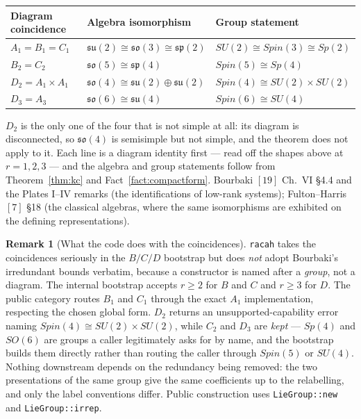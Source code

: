 \documentclass[11pt,a4paper]{article}
\theoremstyle{plain}
\theoremstyle{definition}
\newtheorem{remark}[theorem]{Remark}
\newcommand{\su}{\mathfrak{su}}
\newcommand{\so}{\mathfrak{so}}
\newcommand{\symp}{\mathfrak{sp}}
\newcommand{\code}[1]{\texttt{#1}}
\begin{document}
\begin{center}
\begin{tabular}{@{}lll@{}}
\toprule
Diagram coincidence & Algebra isomorphism & Group statement \\
\midrule
$A_1 = B_1 = C_1$ & $\su(2)\cong\so(3)\cong\symp(2)$ & $SU(2)\cong Spin(3)\cong Sp(2)$ \\
$B_2 = C_2$ & $\so(5)\cong\symp(4)$ & $Spin(5)\cong Sp(4)$ \\
$D_2 = A_1\times A_1$ & $\so(4)\cong\su(2)\oplus\su(2)$ & $Spin(4)\cong SU(2)\times SU(2)$ \\
$D_3 = A_3$ & $\so(6)\cong\su(4)$ & $Spin(6)\cong SU(4)$ \\
\bottomrule
\end{tabular}
\end{center}

\noindent
$D_2$ is the only one of the four that is not simple at all: its diagram is
disconnected, so $\so(4)$ is semisimple but not simple, and the theorem does
not apply to it. Each line is a diagram identity first --- read off the shapes
above at $r=1,2,3$ --- and the algebra and group statements follow from
Theorem~\ref{thm:kc} and Fact~\ref{fact:compactform}. Bourbaki $[19]$
Ch.~VI \S4.4 and the Plates I--IV remarks (the identifications of low-rank
systems); Fulton--Harris $[7]$ \S18 (the classical algebras, where the same
isomorphisms are exhibited on the defining representations).

\begin{remark}[What the code does with the coincidences]
\label{rem:lowrank}
\code{racah} takes the coincidences seriously in the $B/C/D$ bootstrap but
does \emph{not} adopt Bourbaki's irredundant bounds verbatim, because a
constructor is named after a \emph{group}, not a diagram. The internal bootstrap accepts $r\ge 2$ for $B$ and $C$ and $r\ge 3$ for $D$.
The public category routes $B_1$ and $C_1$ through the exact $A_1$ implementation,
respecting the chosen global form. $D_2$ returns an unsupported-capability error
naming $Spin(4)\cong SU(2)\times SU(2)$, while $C_2$ and $D_3$ are
\emph{kept} --- $Sp(4)$ and $SO(6)$ are groups a caller legitimately asks for
by name, and the bootstrap builds them directly rather than routing the caller
through $Spin(5)$ or $SU(4)$. Nothing downstream depends on the redundancy
being removed: the two presentations of the same group give the same
coefficients up to the relabelling, and only the label conventions differ.
Public construction uses \code{LieGroup::new} and \code{LieGroup::irrep}.
\end{remark}
\end{document}
